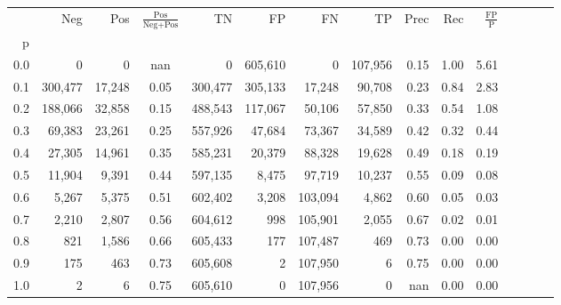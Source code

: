 \begin{tabular}{rrrcrrrrrrrrrrr}
\toprule
{} &      Neg &     Pos & $\frac{\text{Pos}}{\text{Neg}+\text{Pos}}$ &       TN &       FP &       FN &       TP &  Prec &   Rec & $\frac{\text{FP}}{\text{P}}$ \\
p   &          &         &                                            &          &          &          &          &       &       &                              \\
\midrule
0.0 &        0 &       0 &                                        nan &        0 &  605,610 &        0 &  107,956 &  0.15 &  1.00 &                         5.61 \\
0.1 &  300,477 &  17,248 &                                       0.05 &  300,477 &  305,133 &   17,248 &   90,708 &  0.23 &  0.84 &                         2.83 \\
0.2 &  188,066 &  32,858 &                                       0.15 &  488,543 &  117,067 &   50,106 &   57,850 &  0.33 &  0.54 &                         1.08 \\
0.3 &   69,383 &  23,261 &                                       0.25 &  557,926 &   47,684 &   73,367 &   34,589 &  0.42 &  0.32 &                         0.44 \\
0.4 &   27,305 &  14,961 &                                       0.35 &  585,231 &   20,379 &   88,328 &   19,628 &  0.49 &  0.18 &                         0.19 \\
0.5 &   11,904 &   9,391 &                                       0.44 &  597,135 &    8,475 &   97,719 &   10,237 &  0.55 &  0.09 &                         0.08 \\
0.6 &    5,267 &   5,375 &                                       0.51 &  602,402 &    3,208 &  103,094 &    4,862 &  0.60 &  0.05 &                         0.03 \\
0.7 &    2,210 &   2,807 &                                       0.56 &  604,612 &      998 &  105,901 &    2,055 &  0.67 &  0.02 &                         0.01 \\
0.8 &      821 &   1,586 &                                       0.66 &  605,433 &      177 &  107,487 &      469 &  0.73 &  0.00 &                         0.00 \\
0.9 &      175 &     463 &                                       0.73 &  605,608 &        2 &  107,950 &        6 &  0.75 &  0.00 &                         0.00 \\
1.0 &        2 &       6 &                                       0.75 &  605,610 &        0 &  107,956 &        0 &   nan &  0.00 &                         0.00 \\
\bottomrule
\end{tabular}
